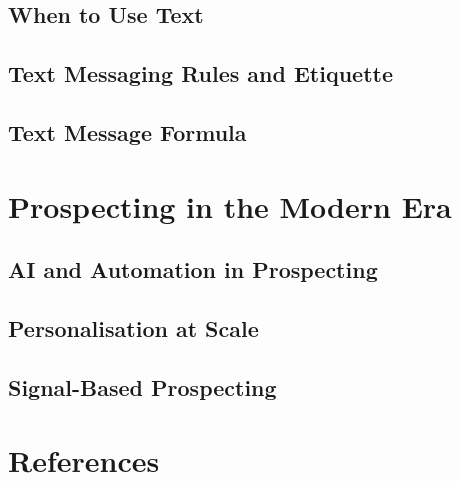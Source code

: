     \subsection{When to Use Text}\mbox{}
    \subsection{Text Messaging Rules and Etiquette}\mbox{}
    \subsection{Text Message Formula}\mbox{}

\section{Prospecting in the Modern Era}\mbox{}
    \subsection{AI and Automation in Prospecting}\mbox{}
    \subsection{Personalisation at Scale}\mbox{}
    \subsection{Signal-Based Prospecting}\mbox{}

\section{References}\mbox{}